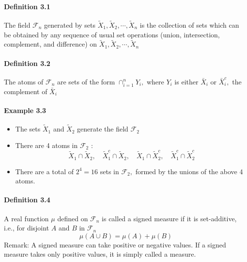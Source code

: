 \documentclass[8pt]{article}
\begin{document}
\paragraph{Definition 3.1} The field $\mathcal{F}_{n}$ generated by sets $\tilde{X}_{1}, \tilde{X}_{2}, \cdots, \tilde{X}_{n}$ is the collection of sets which can be obtained by any sequence of usual set operations (union, intersection, complement, and difference) on $\tilde{X}_{1}, \tilde{X}_{2}, \cdots, \tilde{X}_{n}$

\paragraph{Definition 3.2} The atoms of $\mathcal{F}_{n}$ are sets of the form $\cap_{i=1}^{n} Y_{i},$ where $Y_{i}$ is either $\bar{X}_{i}$ or $\bar{X}_{i}^{c},$ the complement of $\bar{X}_{i}$

\paragraph{Example 3.3}
\begin{itemize}
    \item The sets $\tilde{X}_{1}$ and $\tilde{X}_{2}$ generate the field $\mathcal{F}_{2}$
    \item There are 4 atoms in $\mathcal{F}_{2}$ :
        $$
        \tilde{X}_{1} \cap \tilde{X}_{2},\quad \tilde{X}_{1}^{c} \cap \tilde{X}_{2},\quad \tilde{X}_{1} \cap \tilde{X}_{2}^{c}, \quad \tilde{X}_{1}^{c} \cap \tilde{X}_{2}^{c}
        $$
    \item There are a total of $2^{4}=16$ sets in $\mathcal{F}_{2},$ formed by the unions of the above 4 atoms.
\end{itemize}

\paragraph{Definition 3.4} A real function $\mu$ defined on $\mathcal{F}_{n}$ is called a signed measure if it is set-additive, i.e., for disjoint $A$ and $B$ in $\mathcal{F}_{n}$
$$
\mu(A \cup B)=\mu(A)+\mu(B)
$$
Remark: A signed measure can take positive or negative values. If a signed measure takes only positive values, it is simply called a measure.

\newpage
\end{document}
